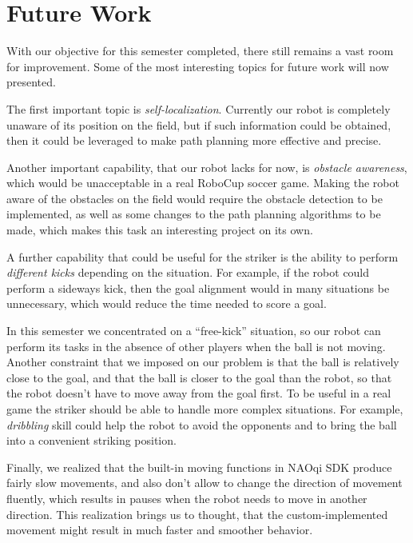 \section{Future Work}

With our objective for this semester completed, there still remains a vast room
for improvement. Some of the most interesting topics for future work will now
presented.

The first important topic is \textit{self-localization}. Currently our robot is
completely unaware of its position on the field, but if such information could
be obtained, then it could be leveraged to make path planning more effective
and precise.

Another important capability, that our robot lacks for now, is \textit{obstacle
  awareness}, which would be unacceptable in a real RoboCup soccer game. Making
the robot aware of the obstacles on the field would require the obstacle
detection to be implemented, as well as some changes to the path planning
algorithms to be made, which makes this task an interesting project on its own.

A further capability that could be useful for the striker is the ability to
perform \textit{different kicks} depending on the situation. For example, if
the robot could perform a sideways kick, then the goal alignment would in many
situations be unnecessary, which would reduce the time needed to score a goal.

In this semester we concentrated on a ``free-kick'' situation, so our robot can
perform its tasks in the absence of other players when the ball is not moving.
Another constraint that we imposed on our problem is that the ball is
relatively close to the goal, and that the ball is closer to the goal than the
robot, so that the robot doesn't have to move away from the goal first. To be
useful in a real game the striker should be able to handle more complex
situations. For example, \textit{dribbling} skill could help the robot to avoid
the opponents and to bring the ball into a convenient striking position.

Finally, we realized that the built-in moving functions in NAOqi SDK produce
fairly slow movements, and also don't allow to change the direction of movement
fluently, which results in pauses when the robot needs to move in another
direction. This realization brings us to thought, that the custom-implemented
movement might result in much faster and smoother behavior.
